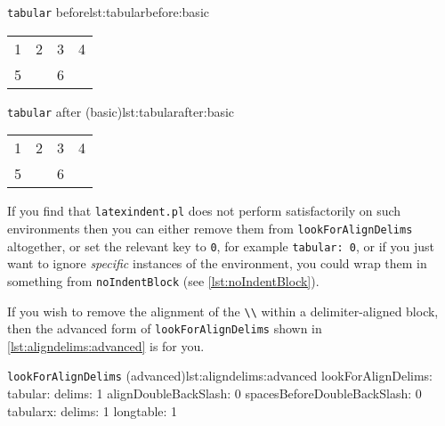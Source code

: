 \documentclass[11pt]{article}
\begin{document}
\begin{itemize}
	\begin{minipage}{.5\textwidth}
		\begin{cmhlistings}[style=demo,columns=fixed]{\lstinline!tabular! before}{lst:tabularbefore:basic}
\begin{tabular}{cccc}
1&	2 &3       &4\\
5& &6       &\\
\end{tabular}
		\end{cmhlistings}
	\end{minipage}%
	\begin{minipage}{.5\textwidth}
		\begin{cmhlistings}[style=demo,columns=fixed]{\lstinline!tabular! after (basic)}{lst:tabularafter:basic}
\begin{tabular}{cccc}
 1 & 2 & 3 & 4 \\
 5 &   & 6 &   \\
\end{tabular}
		\end{cmhlistings}
	\end{minipage}

	If you find that \lstinline!latexindent.pl! does not perform satisfactorily on such
	environments then you can either remove them from \lstinline!lookForAlignDelims! altogether, or set the relevant key to \lstinline!0!, for example \lstinline!tabular: 0!, or if you just want to ignore \emph{specific}
	instances of the environment, you could wrap them in something from \lstinline!noIndentBlock! (see \cref{lst:noIndentBlock}).

    If you wish to remove the alignment of the \lstinline!\\! within a delimiter-aligned block, then the
    advanced form of \lstinline!lookForAlignDelims! shown in \cref{lst:aligndelims:advanced} is for you. 
	      \begin{cmhlistings}[style=yaml]{\lstinline!lookForAlignDelims! (advanced)}{lst:aligndelims:advanced}
lookForAlignDelims:
   tabular: 
      delims: 1
      alignDoubleBackSlash: 0
      spacesBeforeDoubleBackSlash: 0
   tabularx:
      delims: 1
   longtable: 1
	\end{cmhlistings}


\end{itemize}
\end{document}
